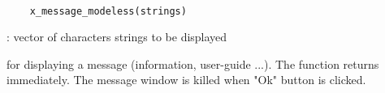 
\begin{mandesc}
  \\ %
\end{mandesc}
\label{x-message-modeless}
\begin{calling_sequence}
  \begin{verbatim}
    x_message_modeless(strings)   
  \end{verbatim}
\end{calling_sequence}
\begin{parameters}
  \begin{varlist}
     : vector of characters strings to be displayed
  \end{varlist}
\end{parameters}
\begin{mandescription}
  for displaying a message (information, user-guide ...). The function
  returns immediately. The message window is killed when "Ok" button is
  clicked.
\end{mandescription}
\begin{examples}
  \begin{program}
  \end{program}
\end{examples}
\begin{manseealso}
      
\end{manseealso}

